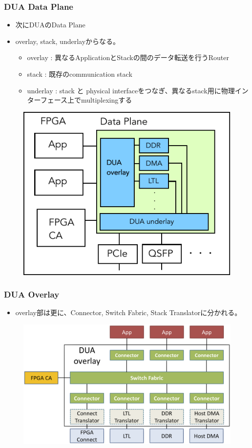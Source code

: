 \documentclass[dvipdfmx,9pt,notheorems]{beamer}
\theoremstyle{definition}
\begin{document}
\begin{frame}\frametitle{DUA Data Plane}
	\begin{itemize}
		\item 次にDUAのData Plane
		\item overlay, stack, underlayからなる。
			\begin{itemize}
				\item overlay  : 異なるApplicationとStackの間のデータ転送を行うRouter
				\item stack    : 既存のcommunication stack
				\item underlay : stack と physical interfaceをつなぎ、異なるstack用に物理インターフェース上でmultiplexingする
			\end{itemize}
	\end{itemize}
  \begin{figure}[htb]
		\includegraphics[scale=0.5]{fig/ez_DUA_DataPlane.pdf}
  \end{figure}
\pnote{
}
\end{frame}


\begin{frame}\frametitle{DUA Overlay}
	\begin{itemize}
		\item overlay部は更に、Connector, Switch Fabric, Stack Translatorに分かれる。
	\end{itemize}
  \begin{figure}[htb]
		\includegraphics[scale=1.0]{fig/figure6.png}
  \end{figure}
\pnote{
}
\end{frame}
\end{document}
